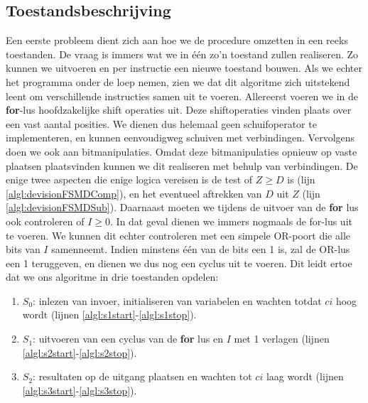 \subsection{Toestandsbeschrijving}
Een eerste probleem dient zich aan hoe we de procedure omzetten in een reeks toestanden. De vraag is immers wat we in \'e\'en zo'n toestand zullen realiseren. Zo kunnen we  uitvoeren en per instructie een nieuwe toestand bouwen. Als we echter het programma onder de loep nemen, zien we dat dit algoritme zich uitstekend leent om verschillende instructies samen uit te voeren. Allereerst voeren we in de \textbf{for}-lus hoofdzakelijke shift operaties uit. Deze shiftoperaties vinden plaats over een vast aantal posities. We dienen dus helemaal geen schuifoperator te implementeren, en kunnen eenvoudigweg schuiven met verbindingen. Vervolgens doen we ook aan bitmanipulaties. Omdat deze bitmanipulaties opnieuw op vaste plaatsen plaatsvinden kunnen we dit realiseren met behulp van verbindingen. De enige twee aspecten die enige logica vereisen is de test of $Z\geq D$ is (lijn \ref{algl:devisionFSMDComp}), en het eventueel aftrekken van $D$ uit $Z$ (lijn \ref{algl:devisionFSMDSub}).
Daarnaast moeten we tijdens de uitvoer van de \textbf{for} lus ook controleren of $I\geq 0$. In dat geval dienen we immers nogmaals de for-lus uit te voeren. We kunnen dit echter controleren met een simpele OR-poort die alle bits van $I$ samenneemt. Indien minstens \'e\'en van de bits een 1 is, zal de OR-lus een 1 teruggeven, en dienen we dus nog een cyclus uit te voeren. Dit leidt ertoe dat we ons algoritme in drie toestanden opdelen:
\begin{enumerate}
 \item $S_0$: inlezen van invoer, initialiseren van variabelen en wachten totdat $ci$ hoog wordt (lijnen \ref{algl:s1start}-\ref{algl:s1stop}).
 \item $S_1$: uitvoeren van een cyclus van de \textbf{for} lus en $I$ met 1 verlagen (lijnen \ref{algl:s2start}-\ref{algl:s2stop}).
 \item $S_2$: resultaten op de uitgang plaatsen en wachten tot $ci$ laag wordt (lijnen \ref{algl:s3start}-\ref{algl:s3stop}).
\end{enumerate}

